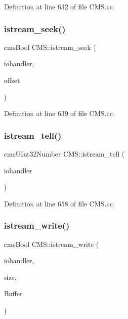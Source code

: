 Definition at line 632 of file C\+M\+S.\+cc.

\mbox{\label{namespace_c_m_s_a55b53b00daedc8b76eba456e43713dd6}} 
\subsubsection{\texorpdfstring{istream\+\_\+seek()}{istream\_seek()}}
{\footnotesize\ttfamily cms\+Bool C\+M\+S\+::istream\+\_\+seek (\begin{DoxyParamCaption}\item[{cms\+I\+O\+H\+A\+N\+D\+L\+ER $\ast$}]{iohandler,  }\item[{cms\+U\+Int32\+Number}]{offset }\end{DoxyParamCaption})}



Definition at line 639 of file C\+M\+S.\+cc.

\mbox{\label{namespace_c_m_s_a9e1e064622cf44c9e8958a37c0bae3e4}} 
\subsubsection{\texorpdfstring{istream\+\_\+tell()}{istream\_tell()}}
{\footnotesize\ttfamily cms\+U\+Int32\+Number C\+M\+S\+::istream\+\_\+tell (\begin{DoxyParamCaption}\item[{cms\+I\+O\+H\+A\+N\+D\+L\+ER $\ast$}]{iohandler }\end{DoxyParamCaption})}



Definition at line 658 of file C\+M\+S.\+cc.

\mbox{\label{namespace_c_m_s_a3562813bdb675436999b19d1b51a986f}} 
\subsubsection{\texorpdfstring{istream\+\_\+write()}{istream\_write()}}
{\footnotesize\ttfamily cms\+Bool C\+M\+S\+::istream\+\_\+write (\begin{DoxyParamCaption}\item[{cms\+I\+O\+H\+A\+N\+D\+L\+ER $\ast$}]{iohandler,  }\item[{cms\+U\+Int32\+Number}]{size,  }\item[{const void $\ast$}]{Buffer }\end{DoxyParamCaption})}



